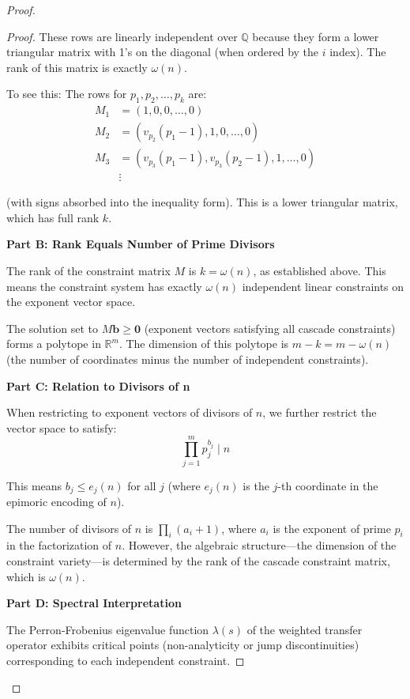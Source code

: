 \begin{proof}
\begin{proof}
These rows are linearly independent over $\mathbb{Q}$ because they form a lower triangular matrix with 1's on the diagonal (when ordered by the $i$ index). The rank of this matrix is exactly $\omega(n)$.

To see this: The rows for $p_1, p_2, \ldots, p_k$ are:
\begin{align}
M_1 &= (1, 0, 0, \ldots, 0) \\
M_2 &= (v_{p_2}(p_1 - 1), 1, 0, \ldots, 0) \\
M_3 &= (v_{p_3}(p_1 - 1), v_{p_3}(p_2 - 1), 1, \ldots, 0) \\
&\vdots
\end{align}

(with signs absorbed into the inequality form). This is a lower triangular matrix, which has full rank $k$.

\noindent \textbf{Part B: Rank Equals Number of Prime Divisors}

The rank of the constraint matrix $M$ is $k = \omega(n)$, as established above. This means the constraint system has exactly $\omega(n)$ independent linear constraints on the exponent vector space.

The solution set to $M \mathbf{b} \geq \mathbf{0}$ (exponent vectors satisfying all cascade constraints) forms a polytope in $\mathbb{R}^m$. The dimension of this polytope is $m - k = m - \omega(n)$ (the number of coordinates minus the number of independent constraints).

\noindent \textbf{Part C: Relation to Divisors of n}

When restricting to exponent vectors of divisors of $n$, we further restrict the vector space to satisfy:
\begin{equation}
\prod_{j=1}^m p_j^{b_j} \mid n
\end{equation}

This means $b_j \leq e_j(n)$ for all $j$ (where $e_j(n)$ is the $j$-th coordinate in the epimoric encoding of $n$).

The number of divisors of $n$ is $\prod_i (a_i + 1)$, where $a_i$ is the exponent of prime $p_i$ in the factorization of $n$. However, the algebraic structure—the dimension of the constraint variety—is determined by the rank of the cascade constraint matrix, which is $\omega(n)$.

\noindent \textbf{Part D: Spectral Interpretation}

The Perron-Frobenius eigenvalue function $\lambda(s)$ of the weighted transfer operator exhibits critical points (non-analyticity or jump discontinuities) corresponding to each independent constraint.


\end{proof}
\end{proof}
